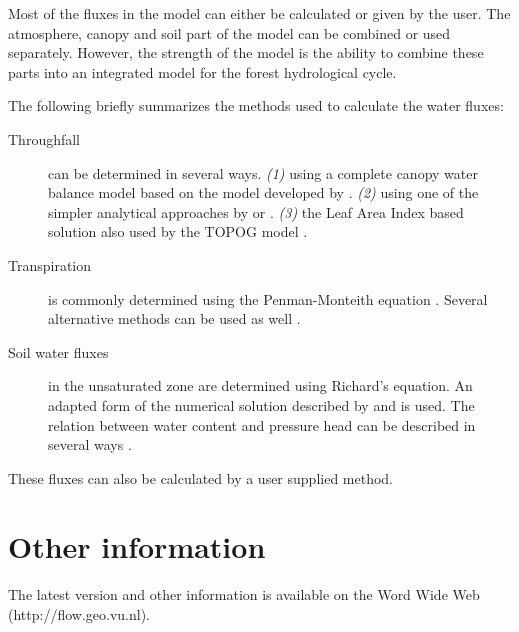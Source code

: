 \documentclass[twocolumn]{article}
\newcommand{\Index}[1]{#1\index{#1}}
\newcommand{\url}[1]{#1}
\begin{document}
Most of the fluxes in the model can either be
calculated or given by the user. The atmosphere, canopy and soil part
of the model can be combined or used separately. However, the strength
of the model is the ability to combine  these parts into an
integrated model for the forest hydrological cycle. 

The following briefly summarizes the methods used to
calculate the water fluxes:
\begin{description}
\item[Throughfall] can be determined in several ways. {\em (1)} using 
a complete canopy water balance model based on the model developed by
 . {\em (2)} using one of the simpler 
analytical approaches by   or
 .  {\em (3)} the Leaf Area Index based
solution also used by the TOPOG model \cite{vertessy1993140}.

\item[Transpiration] is commonly determined using the Penman-Monteith
equation \cite{monteith1965}. Several alternative methods can be used 
as well \cite{penman1956N,makkink1957,makkink1961,commissie1988N}.

\item[Soil water fluxes] in the unsaturated zone are determined using
Richard's equation. An adapted form of the numerical solution described
by    and   is used.
The relation between water content and pressure head can be
described in several ways 
\cite{genuchten1980179,mualem1976261,clapp1978263}.

\end{description}
These fluxes can also be calculated by a user supplied method.

\section*{Other information}

The latest version and other information is  available on the
\Index{Word Wide Web}
(\url{http://flow.geo.vu.nl}). 


\end{document}
